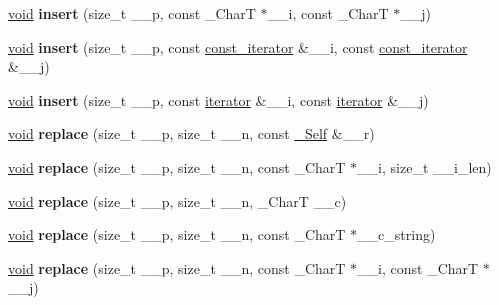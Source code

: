\begin{DoxyCompactItemize}
\item 
\mbox{\label{classrope_a488286a06e22011867519e808f12fd8d}} 
\hyperlink{interfacevoid}{void} {\bfseries insert} (size\+\_\+t \+\_\+\+\_\+p, const \+\_\+\+CharT $\ast$\+\_\+\+\_\+i, const \+\_\+\+CharT $\ast$\+\_\+\+\_\+j)
\item 
\mbox{\label{classrope_a81a7b27eda5675d9d377bf7e8de2d996}} 
\hyperlink{interfacevoid}{void} {\bfseries insert} (size\+\_\+t \+\_\+\+\_\+p, const \hyperlink{class___rope__const__iterator}{const\+\_\+iterator} \&\+\_\+\+\_\+i, const \hyperlink{class___rope__const__iterator}{const\+\_\+iterator} \&\+\_\+\+\_\+j)
\item 
\mbox{\label{classrope_a1d514535a1eb19a45821acb093931cce}} 
\hyperlink{interfacevoid}{void} {\bfseries insert} (size\+\_\+t \+\_\+\+\_\+p, const \hyperlink{class___rope__iterator}{iterator} \&\+\_\+\+\_\+i, const \hyperlink{class___rope__iterator}{iterator} \&\+\_\+\+\_\+j)
\item 
\mbox{\label{classrope_a90e5c2663bde7700afa8ba0c316ab8a5}} 
\hyperlink{interfacevoid}{void} {\bfseries replace} (size\+\_\+t \+\_\+\+\_\+p, size\+\_\+t \+\_\+\+\_\+n, const \hyperlink{classrope}{\+\_\+\+Self} \&\+\_\+\+\_\+r)
\item 
\mbox{\label{classrope_a3039135dab20bac8b73be1092d78e8d2}} 
\hyperlink{interfacevoid}{void} {\bfseries replace} (size\+\_\+t \+\_\+\+\_\+p, size\+\_\+t \+\_\+\+\_\+n, const \+\_\+\+CharT $\ast$\+\_\+\+\_\+i, size\+\_\+t \+\_\+\+\_\+i\+\_\+len)
\item 
\mbox{\label{classrope_aab15826632cf3802d994eb545e8d314f}} 
\hyperlink{interfacevoid}{void} {\bfseries replace} (size\+\_\+t \+\_\+\+\_\+p, size\+\_\+t \+\_\+\+\_\+n, \+\_\+\+CharT \+\_\+\+\_\+c)
\item 
\mbox{\label{classrope_ad23ca1115f7e5a318be9e6a615143557}} 
\hyperlink{interfacevoid}{void} {\bfseries replace} (size\+\_\+t \+\_\+\+\_\+p, size\+\_\+t \+\_\+\+\_\+n, const \+\_\+\+CharT $\ast$\+\_\+\+\_\+c\+\_\+string)
\item 
\mbox{\label{classrope_ad422cb0d5134774afc08cd01c0e2a34b}} 
\hyperlink{interfacevoid}{void} {\bfseries replace} (size\+\_\+t \+\_\+\+\_\+p, size\+\_\+t \+\_\+\+\_\+n, const \+\_\+\+CharT $\ast$\+\_\+\+\_\+i, const \+\_\+\+CharT $\ast$\+\_\+\+\_\+j)

\end{DoxyCompactItemize}
